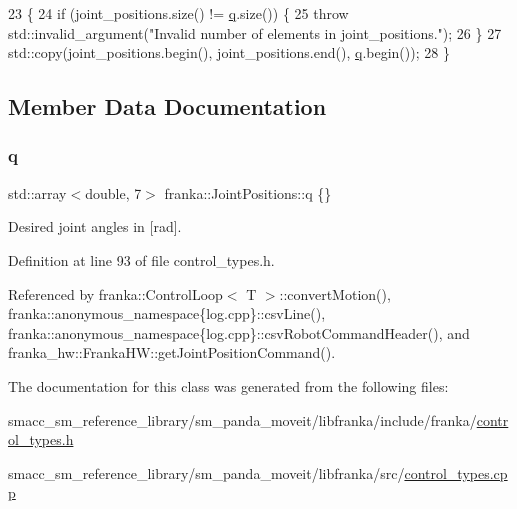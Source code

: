 \begin{DoxyCode}
23                                                                           \{
24   \textcolor{keywordflow}{if} (joint\_positions.size() != \hyperlink{classfranka_1_1JointPositions_a40e9098abe1c51cd48e17e41fbf78337}{q}.size()) \{
25     \textcolor{keywordflow}{throw} std::invalid\_argument(\textcolor{stringliteral}{"Invalid number of elements in joint\_positions."});
26   \}
27   std::copy(joint\_positions.begin(), joint\_positions.end(), \hyperlink{classfranka_1_1JointPositions_a40e9098abe1c51cd48e17e41fbf78337}{q}.begin());
28 \}
\end{DoxyCode}


\subsection{Member Data Documentation}
\mbox{\label{classfranka_1_1JointPositions_a40e9098abe1c51cd48e17e41fbf78337}} 
\subsubsection{\texorpdfstring{q}{q}}
{\footnotesize\ttfamily std\+::array$<$double, 7$>$ franka\+::\+Joint\+Positions\+::q \{\}}

Desired joint angles in \mbox{[}rad\mbox{]}. 

Definition at line 93 of file control\+\_\+types.\+h.



Referenced by franka\+::\+Control\+Loop$<$ T $>$\+::convert\+Motion(), franka\+::anonymous\+\_\+namespace\{log.\+cpp\}\+::csv\+Line(), franka\+::anonymous\+\_\+namespace\{log.\+cpp\}\+::csv\+Robot\+Command\+Header(), and franka\+\_\+hw\+::\+Franka\+H\+W\+::get\+Joint\+Position\+Command().



The documentation for this class was generated from the following files\+:\begin{DoxyCompactItemize}
\item 
smacc\+\_\+sm\+\_\+reference\+\_\+library/sm\+\_\+panda\+\_\+moveit/libfranka/include/franka/\hyperlink{control__types_8h}{control\+\_\+types.\+h}\item 
smacc\+\_\+sm\+\_\+reference\+\_\+library/sm\+\_\+panda\+\_\+moveit/libfranka/src/\hyperlink{control__types_8cpp}{control\+\_\+types.\+cpp}\end{DoxyCompactItemize}
